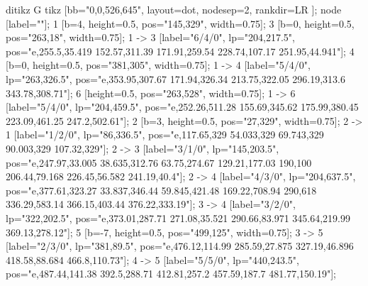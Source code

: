 ditikz G {
	tikz [bb="0,0,526,645",
		layout=dot,
		nodesep=2,
		rankdir=LR
	];
	node [label="\N"];
	1	[b=4,
		height=0.5,
		pos="145,329",
		width=0.75];
	3	[b=0,
		height=0.5,
		pos="263,18",
		width=0.75];
	1 -> 3	[label="6/4/0",
		lp="204,217.5",
		pos="e,255.5,35.419 152.57,311.39 171.91,259.54 228.74,107.17 251.95,44.941"];
	4	[b=0,
		height=0.5,
		pos="381,305",
		width=0.75];
	1 -> 4	[label="5/4/0",
		lp="263,326.5",
		pos="e,353.95,307.67 171.94,326.34 213.75,322.05 296.19,313.6 343.78,308.71"];
	6	[height=0.5,
		pos="263,528",
		width=0.75];
	1 -> 6	[label="5/4/0",
		lp="204,459.5",
		pos="e,252.26,511.28 155.69,345.62 175.99,380.45 223.09,461.25 247.2,502.61"];
	2	[b=3,
		height=0.5,
		pos="27,329",
		width=0.75];
	2 -> 1	[label="1/2/0",
		lp="86,336.5",
		pos="e,117.65,329 54.033,329 69.743,329 90.003,329 107.32,329"];
	2 -> 3	[label="3/1/0",
		lp="145,203.5",
		pos="e,247.97,33.005 38.635,312.76 63.75,274.67 129.21,177.03 190,100 206.44,79.168 226.45,56.582 241.19,40.4"];
	2 -> 4	[label="4/3/0",
		lp="204,637.5",
		pos="e,377.61,323.27 33.837,346.44 59.845,421.48 169.22,708.94 290,618 336.29,583.14 366.15,403.44 376.22,333.19"];
	3 -> 4	[label="3/2/0",
		lp="322,202.5",
		pos="e,373.01,287.71 271.08,35.521 290.66,83.971 345.64,219.99 369.13,278.12"];
	5	[b=-7,
		height=0.5,
		pos="499,125",
		width=0.75];
	3 -> 5	[label="2/3/0",
		lp="381,89.5",
		pos="e,476.12,114.99 285.59,27.875 327.19,46.896 418.58,88.684 466.8,110.73"];
	4 -> 5	[label="5/5/0",
		lp="440,243.5",
		pos="e,487.44,141.38 392.5,288.71 412.81,257.2 457.59,187.7 481.77,150.19"];
}
